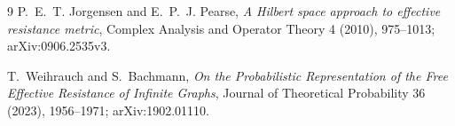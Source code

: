 \documentclass[11pt]{article}
\begin{document}
\begin{thebibliography}{9}
P.~E.~T. Jorgensen and E.~P.~J. Pearse,
\emph{A Hilbert space approach to effective resistance metric},
Complex Analysis and Operator Theory 4 (2010), 975--1013;
arXiv:0906.2535v3.

T.~Weihrauch and S.~Bachmann,
\emph{On the Probabilistic Representation of the Free Effective Resistance
of Infinite Graphs}, Journal of Theoretical Probability 36 (2023),
1956--1971; arXiv:1902.01110.
\end{thebibliography}
\end{document}
